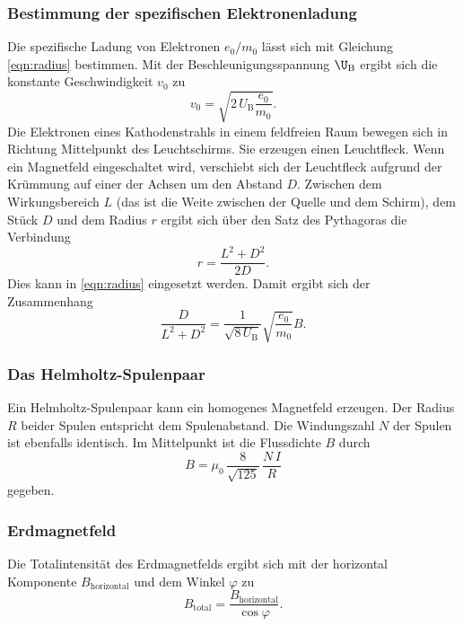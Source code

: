 \subsubsection{Bestimmung der spezifischen Elektronenladung}
Die spezifische 
Ladung von Elektronen $e_\text{0}/m_\text{0}$ lässt sich
mit Gleichung \eqref{eqn:radius} bestimmen. 
Mit der Beschleunigungsspannung $\U_\text{B}$ ergibt sich die 
konstante Geschwindigkeit $v_\text{0}$ zu 
\begin{equation*}
    v_\text{0}= \sqrt{2 \, U_\text{B} \frac{e_\text{0}}{m_\text{0}}}.
\end{equation*}
Die Elektronen eines Kathodenstrahls 
in einem feldfreien Raum bewegen sich
in Richtung Mittelpunkt des Leuchtschirms.
Sie erzeugen einen Leuchtfleck. 
Wenn ein Magnetfeld eingeschaltet wird, verschiebt sich 
der Leuchtfleck aufgrund der Krümmung auf einer der Achsen 
um den Abstand $D$. Zwischen dem Wirkungsbereich $L$ (das ist die Weite 
zwischen der Quelle und dem Schirm), dem Stück $D$ und dem 
Radius $r$ ergibt sich über den Satz des Pythagoras die 
Verbindung
\begin{equation*}
    r = \frac{L^2 + D^2}{2D}.
\end{equation*}
Dies kann in \eqref{eqn:radius} eingesetzt werden.
Damit ergibt sich der Zusammenhang
\begin{equation}
    \frac{D}{L^2 + D^2}= \frac{1}{\sqrt{8 \, U_\text{B}}}\sqrt{\frac{e_\text{0}}{m_\text{0}}} B.
    \label{eqn:Ende}
\end{equation}

\subsubsection{Das Helmholtz-Spulenpaar}
Ein Helmholtz-Spulenpaar kann ein homogenes Magnetfeld erzeugen.
Der Radius $R$ beider Spulen entspricht dem Spulenabstand.
Die Windungszahl $N$ der Spulen ist ebenfalls identisch.
Im Mittelpunkt ist die Flussdichte $B$ durch
\begin{equation}
    B = \mu_0 \, \frac{8}{\sqrt{125}} \, \frac{N \, I}{R}
    \label{eqn:helmholtz}
\end{equation}
gegeben.

\subsubsection{Erdmagnetfeld}
Die Totalintensität des Erdmagnetfelds ergibt sich mit der horizontal Komponente $B_\text{horizontal}$ und dem Winkel $\varphi$ zu %
\begin{equation}
    B_\text{total} = \frac{B_\text{horizontal}}{\cos{\varphi}}.
    \label{eqn:btotal}
\end{equation}
